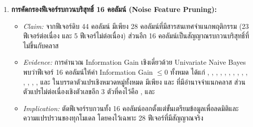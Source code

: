 \begin{enumerate}
  \item \textbf{การคัดกรองฟีเจอร์รบกวนบริสุทธิ์ 16 คอลัมน์ (Noise Feature Pruning):}
  \begin{itemize}
    \item \textit{Claim:} จากฟีเจอร์ดิบ 44 คอลัมน์ มีเพียง 28 คอลัมน์ที่มีสารสนเทศจำแนกพฤติกรรม (23 ฟีเจอร์ต่อเนื่อง และ 5 ฟีเจอร์ไม่ต่อเนื่อง) ส่วนอีก 16 คอลัมน์เป็นสัญญาณรบกวนบริสุทธิ์ที่ไม่ขึ้นกับคลาส
    \item \textit{Evidence:} การคำนวณ Information Gain เชิงเดี่ยวด้วย Univariate Naive Bayes พบว่าฟีเจอร์ 16 คอลัมน์ให้ค่า Information Gain $\le 0$ ทั้งหมด ได้แก่ , , , , , , , , , , , , , ,  และ  ในบรรดาตัวแปรเชิงหมวดหมู่ทั้งหมด มีเพียง  และ  ที่มีอำนาจจำแนกคลาส ส่วนตัวแปรไม่ต่อเนื่องเชิงตัวเลขอีก 3 ตัวที่คงไว้คือ ,  และ 
    \item \textit{Implication:} ตัดฟีเจอร์รบกวนทั้ง 16 คอลัมน์ออกตั้งแต่ขั้นเตรียมข้อมูลเพื่อลดมิติและความแปรปรวนของทุกโมเดล โดยคงไว้เฉพาะ 28 ฟีเจอร์ที่มีสัญญาณจริง
  \end{itemize}


\end{enumerate}
